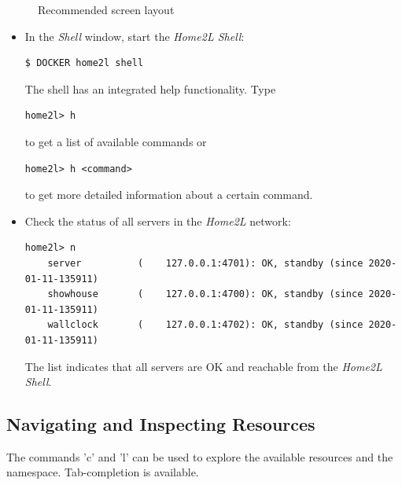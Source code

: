 \documentclass[12pt,english,parskip=half,headheight=19pt]{scrreprt}
\newcommand{\figsvg}[2][]{}            %
\newcommand{\figsvg}[2][]{\href{#2}{}} %
\begin{document}
\begin{figure}[ht]
  \centering
  \figsvg[width=0.95\linewidth,keepaspectratio]{figs/tutorial-layout.svg}
  \caption[l]{Recommended screen layout}
  \label{fig:tutorial-layout}
\end{figure}


\begin{itemize}[$\blacktriangleright$]

\item
  In the \textit{Shell} window, start the \textit{Home2L Shell}:
  \begin{lstlisting}[language=bash]
    $ DOCKER home2l shell
  \end{lstlisting}
  The shell has an integrated help functionality. Type
  \begin{lstlisting}[language=home2l]
    home2l> h
  \end{lstlisting}
  to get a list of available commands or
  \begin{lstlisting}[language=home2l]
    home2l> h <command>
  \end{lstlisting}
  to get more detailed information about a certain command.

\item
  Check the status of all servers in the \textit{Home2L} network:
  \begin{lstlisting}[language=home2l]
    home2l> n
    server          (    127.0.0.1:4701): OK, standby (since 2020-01-11-135911)
    showhouse       (    127.0.0.1:4700): OK, standby (since 2020-01-11-135911)
    wallclock       (    127.0.0.1:4702): OK, standby (since 2020-01-11-135911)
  \end{lstlisting}
  The list indicates that all servers are OK and reachable from the
  \textit{Home2L Shell}.

\end{itemize}





\subsection{Navigating and Inspecting Resources}
\label{sec:tutorial-shell-inspect}


The commands 'c' and 'l' can be used to explore the available resources and the namespace.
Tab-completion is available.
\end{document}
